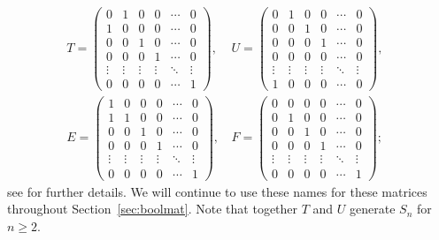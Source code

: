 \documentclass[11pt]{article}
\numberwithin{equation}{section}
\begin{document}
\begin{align}
  \label{eq:RegularGens}
  T = \begin{pmatrix}
    0 & 1 & 0 & 0 & \cdots & 0 \\
    1 & 0 & 0 & 0 & \cdots & 0 \\
    0 & 0 & 1 & 0 & \cdots & 0 \\
    0 & 0 & 0 & 1 & \cdots & 0 \\
    \vdots  & \vdots & \vdots & \vdots & \ddots & \vdots\\
    0 & 0 & 0 & 0 & \cdots & 1 
  \end{pmatrix}\text{, }&
  U = \begin{pmatrix}
    0 & 1 & 0 & 0 & \cdots & 0 \\
    0 & 0 & 1 & 0 & \cdots & 0 \\
    0 & 0 & 0 & 1 & \cdots & 0 \\
    0 & 0 & 0 & 0 & \cdots & 0 \\
    \vdots  & \vdots & \vdots & \vdots & \ddots & \vdots\\
    1 & 0 & 0 & 0 & \cdots & 0 
  \end{pmatrix},&\\
  E = \begin{pmatrix}
    1 & 0 & 0 & 0 & \cdots & 0 \\
    1 & 1 & 0 & 0 & \cdots & 0 \\
    0 & 0 & 1 & 0 & \cdots & 0 \\
    0 & 0 & 0 & 1 & \cdots & 0 \\
    \vdots  & \vdots & \vdots & \vdots & \ddots & \vdots\\
    0 & 0 & 0 & 0 & \cdots & 1 
  \end{pmatrix}\text{, }&
  F = \begin{pmatrix}
    0 & 0 & 0 & 0 & \cdots & 0 \\
    0 & 1 & 0 & 0 & \cdots & 0 \\
    0 & 0 & 1 & 0 & \cdots & 0 \\
    0 & 0 & 0 & 1 & \cdots & 0 \\
    \vdots  & \vdots & \vdots & \vdots & \ddots & \vdots\\
    0 & 0 & 0 & 0 & \cdots & 1
  \end{pmatrix};
\end{align}
see \cite{Roush1977aa} for further details.
We will continue to use these names for these matrices throughout
Section~\ref{sec:boolmat}. Note that together $T$ and $U$ generate $S_n$ for $n
\geq 2$.
\end{document}
